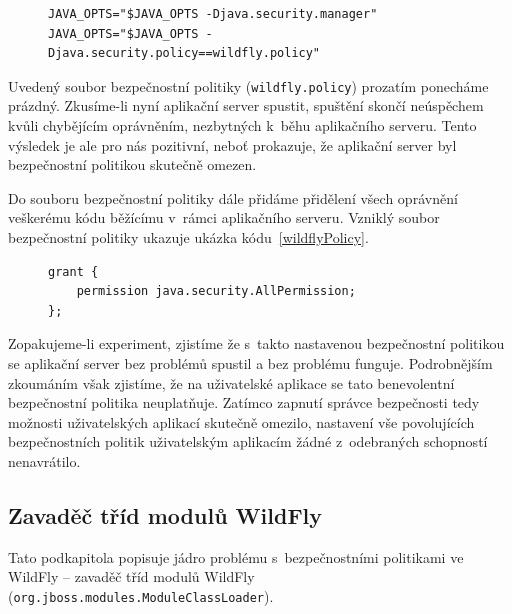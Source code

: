 \begin{figure}[tbh]
\begin{lstlisting}[caption=Doplnění spouštěcího skriptu o~použití správce bezpečnosti, label=wildflySeSMcode]
JAVA_OPTS="$JAVA_OPTS -Djava.security.manager"
JAVA_OPTS="$JAVA_OPTS -Djava.security.policy==wildfly.policy"
\end{lstlisting}
\end{figure}

Uvedený soubor bezpečnostní politiky ({\tt wildfly.policy}) prozatím ponecháme prázdný.
Zkusíme-li nyní aplikační server spustit, spuštění skončí neúspěchem kvůli chybějícím oprávněním, nezbytných k~běhu aplikačního serveru. Tento výsledek je ale pro nás pozitivní, neboť prokazuje, že aplikační server byl bezpečnostní politikou skutečně omezen.

Do souboru bezpečnostní politiky dále přidáme přidělení všech oprávnění veškerému kódu běžícímu v~rámci aplikačního serveru. Vzniklý soubor bezpečnostní politiky ukazuje ukázka kódu~\ref{wildflyPolicy}.

\begin{figure}[tbh]
\begin{lstlisting}[caption=První testovací soubor bezpečnostní politiky, label=wildflyPolicy]
grant {
    permission java.security.AllPermission;
};
\end{lstlisting}
\end{figure}

Zopakujeme-li experiment, zjistíme že s~takto nastavenou bezpečnostní politikou se aplikační server bez problémů spustil a bez problému funguje.
Podrobnějším zkoumáním však zjistíme, že na uživatelské aplikace se tato benevolentní bezpečnostní politika neuplatňuje.
Zatímco zapnutí správce bezpečnosti tedy možnosti uživatelských aplikací skutečně omezilo, nastavení vše povolujících bezpečnostních politik uživatelským
aplikacím žádné z~odebraných schopností nenavrátilo.

\subsection{Zavaděč tříd modulů WildFly} \label{moduleClassLoader}

Tato podkapitola popisuje jádro problému s~bezpečnostními politikami ve WildFly -- zavaděč tříd modulů WildFly ({\tt org.jboss.modules.ModuleClassLoader}).

